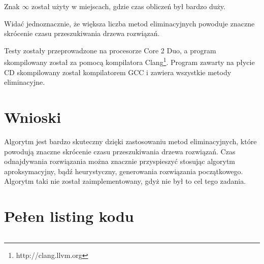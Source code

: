   Znak $\infty$ został użyty w miejscach, gdzie czas obliczeń był bardzo duży.
  \vspace{1em}

  Widać jednoznacznie, że większa liczba metod eliminacyjnych powoduje znaczne
  skrócenie czasu przeszukiwania drzewa rozwiązań.
  \vspace{1em}

  Testy zostały przeprowadzone na procesorze Core 2 Duo, a program skompilowany
  został za pomocą kompilatora Clang\footnote{http://clang.llvm.org}. Program
  zawarty na płycie CD skompilowany został kompilatorem GCC i zawiera wszystkie
  metody eliminacyjne.


\section{Wnioski} %
  \label{sec:wnioski}

  Algorytm jest bardzo skuteczny dzięki zastosowaniu metod eliminacyjnych, które
  powodują znaczne skrócenie czasu przeszukiwania drzewa rozwiązań.
  Czas odnajdywania rozwiązania można znacznie przyspieszyć stosując algorytm
  aproksymacyjny, bądź heurystyczny, generowania rozwiązania początkowego.
  Algorytm taki nie został zaimplementowany, gdyż nie był to cel tego zadania.


\newpage
\appendix
\section{Pełen listing kodu} %
  \label{sec:listing}
  \singlespacing
  \inputminted{c}{../bb.c}


